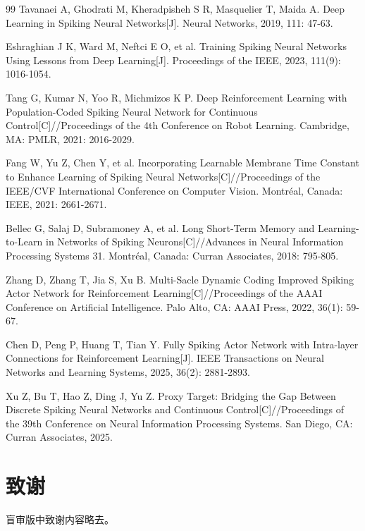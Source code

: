 \documentclass[UTF8,zihao=-4,oneside,openany]{ctexbook}
\begin{document}
\begin{thebibliography}{99}
Tavanaei A, Ghodrati M, Kheradpisheh S R, Masquelier T, Maida A. Deep Learning in Spiking Neural Networks[J]. Neural Networks, 2019, 111: 47-63.

Eshraghian J K, Ward M, Neftci E O, et al. Training Spiking Neural Networks Using Lessons from Deep Learning[J]. Proceedings of the IEEE, 2023, 111(9): 1016-1054.

Tang G, Kumar N, Yoo R, Michmizos K P. Deep Reinforcement Learning with Population-Coded Spiking Neural Network for Continuous Control[C]//Proceedings of the 4th Conference on Robot Learning. Cambridge, MA: PMLR, 2021: 2016-2029.

Fang W, Yu Z, Chen Y, et al. Incorporating Learnable Membrane Time Constant to Enhance Learning of Spiking Neural Networks[C]//Proceedings of the IEEE/CVF International Conference on Computer Vision. Montréal, Canada: IEEE, 2021: 2661-2671.

Bellec G, Salaj D, Subramoney A, et al. Long Short-Term Memory and Learning-to-Learn in Networks of Spiking Neurons[C]//Advances in Neural Information Processing Systems 31. Montréal, Canada: Curran Associates, 2018: 795-805.

Zhang D, Zhang T, Jia S, Xu B. Multi-Sacle Dynamic Coding Improved Spiking Actor Network for Reinforcement Learning[C]//Proceedings of the AAAI Conference on Artificial Intelligence. Palo Alto, CA: AAAI Press, 2022, 36(1): 59-67.

Chen D, Peng P, Huang T, Tian Y. Fully Spiking Actor Network with Intra-layer Connections for Reinforcement Learning[J]. IEEE Transactions on Neural Networks and Learning Systems, 2025, 36(2): 2881-2893.

Xu Z, Bu T, Hao Z, Ding J, Yu Z. Proxy Target: Bridging the Gap Between Discrete Spiking Neural Networks and Continuous Control[C]//Proceedings of the 39th Conference on Neural Information Processing Systems. San Diego, CA: Curran Associates, 2025.
\end{thebibliography}

\chapter*{致谢}

盲审版中致谢内容略去。
\end{document}

